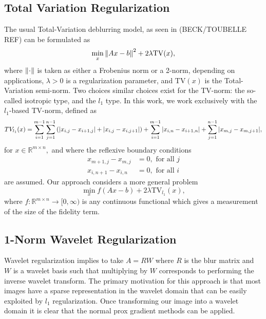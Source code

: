 \documentclass[10pt,a4paper]{article}
\newcommand{\R}{\mathbb{R}}
\begin{document}
\subsection{Total Variation Regularization}
The usual Total-Variation deblurring model, as seen in (BECK/TOUBELLE REF) can be formulated as 
\begin{equation} \label{tv_orig}
\min_{x} \norm{ Ax - b }^2 + 2 \lambda \mathrm{TV}(x),
\end{equation}
where $\norm{\cdot}$ is taken as either a Frobenius norm or a 2-norm, depending on applications,  $\lambda>0$ is a regularization parameter, and $\mathrm{TV}(x)$ is the Total-Variation semi-norm. Two choices similar choices exist for the TV-norm: the so-called isotropic type, and the $l_1$ type. In this work, we work exclusively with the $l_1$-based TV-norm, defined as 
$$ TV_{l_1}(x) = \sum_{i=1}^{m-1} \sum_{j=1}^{n-1} \left( \abs{x_{i,j}  - x_{i+1,j} } + \abs{ x_{i,j} - x_{i,j+1}  } \right) + \sum_{i=1}^{m-1} \abs{ x_{i,n} - x_{i+1,n} } + \sum_{j=1}^{n-1} \abs{ x_{m,j} - x_{m,j+1 } },$$ for $x \in \R^{m \times n},$ and where the reflexive boundary conditions
\begin{align*}
x_{m+1,j} - x_{m,j} &= 0, \textrm{ for all }j \\
 x_{i,n+1} - x_{i,n} &= 0, \textrm{ for all }i
\end{align*}
are assumed. Our approach considers a more general problem
\begin{equation} \label{tv_ours}
\min_{x} f(Ax - b ) + 2 \lambda \mathrm{TV}_{l_1}(x),
\end{equation}
where $f: \R^{m \times n} \rightarrow [0,\infty)$ is any continuous functional which gives a measurement of the size of the fidelity term.


\subsection{1-Norm Wavelet Regularization}

Wavelet regularization implies to take $A = RW$ where  $R$ is the blur matrix and  $W$ is a wavelet basis such that multiplying by $W$ corresponds to performing the inverse wavelet transform. The primary motivation for this approach is that most images have a sparse representation in the wavelet domain that can be easily exploited by $l_1$ regularization. Once transforming our image into a wavelet domain it is clear that the normal prox gradient methods can be applied. 
\end{document}
